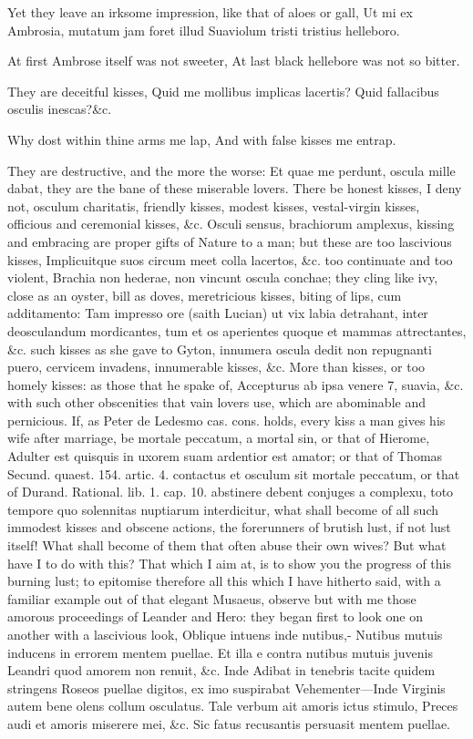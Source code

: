 {Yet they leave an irksome impression, like that of aloes or gall,
Ut mi ex Ambrosia, mutatum jam foret illud
Suaviolum tristi tristius helleboro.

At first Ambrose itself was not sweeter,
At last black hellebore was not so bitter.

They are deceitful kisses,
Quid me mollibus implicas lacertis?
Quid fallacibus osculis inescas?\&c.

Why dost within thine arms me lap,
And with false kisses me entrap.

They are destructive, and the more the worse: Et quae me perdunt,
oscula mille dabat, they are the bane of these miserable lovers. There
be honest kisses, I deny not, osculum charitatis, friendly kisses,
modest kisses, vestal-virgin kisses, officious and ceremonial kisses,
\&c. Osculi sensus, brachiorum amplexus, kissing and embracing are
proper gifts of Nature to a man; but these are too lascivious kisses,
Implicuitque suos circum meet colla lacertos, \&c. too continuate
and too violent, Brachia non hederae, non vincunt oscula conchae;
they cling like ivy, close as an oyster, bill as doves, meretricious
kisses, biting of lips, cum additamento: Tam impresso ore (saith
Lucian) ut vix labia detrahant, inter deosculandum mordicantes,
tum et os aperientes quoque et mammas attrectantes, \&c. such kisses as
she gave to Gyton, innumera oscula dedit non repugnanti puero, cervicem
invadens, innumerable kisses, \&c. More than kisses, or too homely
kisses: as those that he spake of, Accepturus ab ipsa venere 7,
suavia, \&c. with such other obscenities that vain lovers use, which are
abominable and pernicious. If, as Peter de Ledesmo cas. cons. holds,
every kiss a man gives his wife after marriage, be mortale peccatum, a
mortal sin, or that of Hierome, Adulter est quisquis in uxorem
suam ardentior est amator; or that of Thomas Secund. quaest. 154.
artic. 4. contactus et osculum sit mortale peccatum, or that of Durand.
Rational. lib. 1. cap. 10. abstinere debent conjuges a complexu, toto
tempore quo solennitas nuptiarum interdicitur, what shall become of all
such immodest kisses and obscene actions, the forerunners of
brutish lust, if not lust itself! What shall become of them that often
abuse their own wives? But what have I to do with this?
That which I aim at, is to show you the progress of this burning lust;
to epitomise therefore all this which I have hitherto said, with a
familiar example out of that elegant Musaeus, observe but with me those
amorous proceedings of Leander and Hero: they began first to look one
on another with a lascivious look,
Oblique intuens inde nutibus,-
Nutibus mutuis inducens in errorem mentem puellae.
Et illa e contra nutibus mutuis juvenis
Leandri quod amorem non renuit, \&c. Inde
Adibat in tenebris tacite quidem stringens
Roseos puellae digitos, ex imo suspirabat
Vehementer---Inde
Virginis autem bene olens collum osculatus.
Tale verbum ait amoris ictus stimulo,
Preces audi et amoris miserere mei, \&c.
Sic fatus recusantis persuasit mentem puellae.


}
